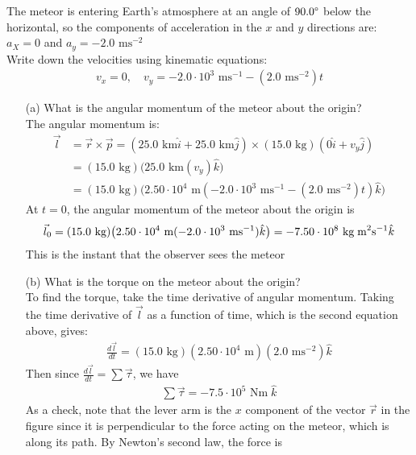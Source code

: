 \documentclass[a4paper]{article}
\newcommand\der[2]{\frac{d #1}{d #2}}
\newcommand\m{\text{ m}}
\newcommand\km{\text{ km}}
\newcommand\Nm{\text{ Nm}}
\newcommand\ms{\text{ ms}^{-1}}
\newcommand\mss{\text{ ms}^{-2}}
\newcommand\kg{\text{ kg}}
\newcommand\kgmms{\text{ kg\;m}^2\text{s}^{-1}}
\begin{document}
\begin{shaded}
\begin{center}
    \end{center}
    The meteor is entering Earth's atmosphere at an angle of $90.0\degree$ below the horizontal, so the components of acceleration in the $x$ and $y$ directions are: $a_X = 0$ and $a_y = -2.0\mss$\\
    Write down the velocities using kinematic equations:
    \begin{align*}
        v_x = 0,\quad v_y = -2.0\cdot10^3\ms - (2.0\mss)t
    \end{align*}
    \begin{enumerate}
        \item[(a)] What is the angular momentum of the meteor about the origin?\\
        The angular momentum is:
        \begin{align*}
            \vec{l} &= \vec{r} \times \vec{p} = (25.0\km\hat{i} + 25.0\km\hat{j}) \times (15.0\kg)(0\hat{i} + v_y\hat{j})\\
            &= (15.0\kg)\big(25.0\km(v_y)\hat{k}\big)\\
            &= (15.0\kg)\big(2.50\cdot10^4\m(-2.0\cdot10^3\ms - (2.0\mss)t)\hat{k}\big)
        \end{align*}
        At $t = 0$, the angular momentum of the meteor about the origin is
        \begin{align*}
            \vec{l}_0 = (15.0\kg)\big(2.50\cdot10^4\m(-2.0\cdot10^3\ms)\hat{k}\big) = -7.50\cdot10^8\kgmms\hat{k}
        \end{align*}
        This is the instant that the observer sees the meteor
        \item[(b)] What is the torque on the meteor about the origin?\\
        To find the torque, take the time derivative of angular momentum. Taking the time derivative of $\vec{l}$ as a function of time, which is the second equation above, gives:
        \begin{align*}
            \der{\vec{l}}{t} = (15.0\kg)(2.50\cdot10^4\m)(2.0\mss)\hat{k}
        \end{align*}
        Then since $\der{\vec{l}}{t} = \sum\vec{\tau}$, we have
        \begin{align*}
            \sum\vec{\tau} = -7.5\cdot10^5\Nm\;\hat{k}
        \end{align*}
        As a check, note that the lever arm is the $x$ component of the vector $\vec{r}$ in the figure since it is perpendicular to the force acting on the meteor, which is along its path. By Newton's second law, the force is

\end{enumerate}
\end{shaded}
\end{document}
